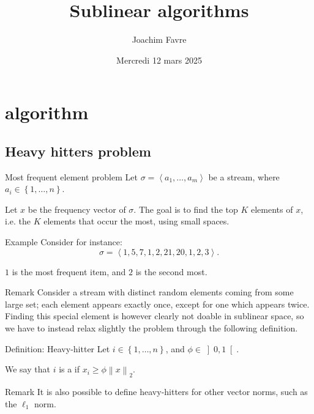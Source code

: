 \documentclass[a4paper]{article}
\title{Sublinear algorithms}
\author{Joachim Favre}
\date{Mercredi 12 mars 2025}
\begin{document}
\maketitle


\section{ algorithm}
\subsection{Heavy hitters problem}

\begin{parag}{Most frequent element problem}
    Let $\sigma = \left\langle a_1, \ldots, a_m \right\rangle$ be a stream, where $a_i \in \left\{1, \ldots, n\right\}$. 

    Let $x$ be the frequency vector of $\sigma$. The goal is to find the top $K$ elements of $x$, i.e. the $K$ elements that occur the most, using small spaces.

    \begin{subparag}{Example}
        Consider for instance: 
        \[\sigma = \left\langle 1, 5, 7, 1, 2, 21, 20, 1, 2, 3 \right\rangle.\]

        $1$ is the most frequent item, and $2$ is the second most.
    \end{subparag}
    
    \begin{subparag}{Remark}
        Consider a stream with distinct random elements coming from some large set; each element appears exactly once, except for one which appears twice. Finding this special element is however clearly not doable in sublinear space, so we have to instead relax slightly the problem through the following definition.
    \end{subparag}
\end{parag}

\begin{parag}{Definition: Heavy-hitter}
    Let $i \in \left\{1, \ldots, n\right\}$, and $\phi \in \left]0, 1\right[ $.

    We say that $i$ is a  if $x_i \geq \phi \left\|x\right\|_2$.

    \begin{subparag}{Remark}
        It is also possible to define heavy-hitters for other vector norms, such as the $\ell_1$ norm.
    \end{subparag}
\end{parag}
\end{document}
